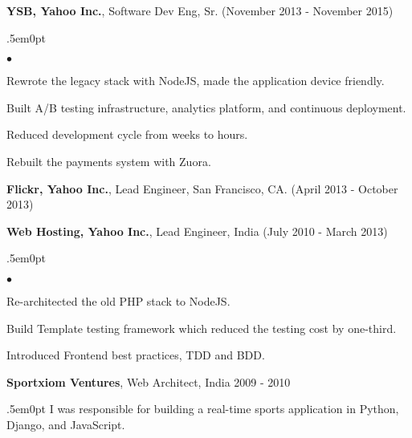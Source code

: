 \documentclass[margin, line, 10pt]{res}
\newenvironment{list2}{
  \begin{list}{$\bullet$}{%
      \setlength{\itemsep}{0in}
      \setlength{\parsep}{0in} \setlength{\parskip}{0in}
      \setlength{\topsep}{0in} \setlength{\partopsep}{0in}
      \setlength{\leftmargin}{0.2in}}}{\end{list}}
\begin{document}
\begin{resume}
{\Large {\bf YSB, Yahoo Inc.}}, Software Dev Eng, Sr. \hfill (November 2013 - November 2015)\\
\begin{adjustwidth}{.5em}{0pt}
\vspace{-.3cm}
\begin{list2}
\vspace{.1cm}
\item Rewrote the legacy stack with NodeJS, made the application device friendly.
\item Built A/B testing infrastructure, analytics platform, and continuous deployment.
\item Reduced development cycle from weeks to hours.
\item Rebuilt the payments system with Zuora.
\end{list2}
\vspace{.05cm}
\end{adjustwidth}

{\Large {\bf Flickr, Yahoo Inc.}}, Lead Engineer, San Francisco, CA.  \hfill (April 2013 - October 2013)\\
\vspace{-.3cm}

{\Large {\bf Web Hosting, Yahoo Inc.}}, Lead Engineer, India  \hfill (July 2010 - March 2013)\\
\begin{adjustwidth}{.5em}{0pt}
\begin{list2}
\vspace{-.2cm}
\item Re-architected the old PHP stack to NodeJS.\\
\vspace{-.3cm}
\item Build Template testing framework which reduced the testing cost by one-third.\\
\vspace{-.3cm}
\item Introduced Frontend best practices, TDD and BDD.\\
\end{list2}
\vspace{.05cm}
\end{adjustwidth}

{\Large {\bf Sportxiom Ventures}}, Web Architect, India  \hfill 2009 - 2010\\
\vspace{-.3cm}
\begin{adjustwidth}{.5em}{0pt}
I was responsible for building a real-time sports application in Python, Django,
and JavaScript.
\end{adjustwidth}
\vspace{.05cm}


\end{resume}
\end{document}
